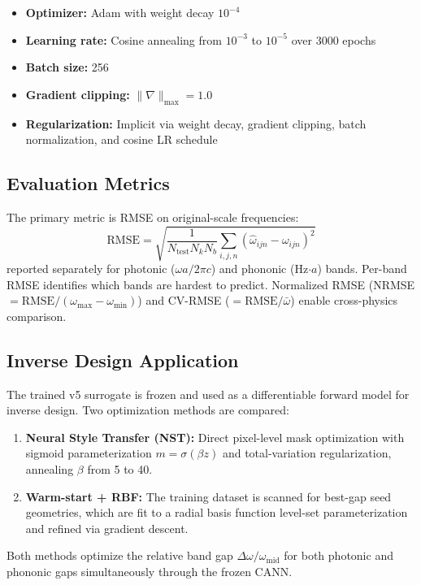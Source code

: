 \documentclass[11pt]{article}
\begin{document}
\begin{itemize}
    \item \textbf{Optimizer:} Adam with weight decay $10^{-4}$
    \item \textbf{Learning rate:} Cosine annealing from $10^{-3}$ to $10^{-5}$ over 3000 epochs
    \item \textbf{Batch size:} 256
    \item \textbf{Gradient clipping:} $\|\nabla\|_\text{max} = 1.0$
    \item \textbf{Regularization:} Implicit via weight decay, gradient clipping, batch normalization, and cosine LR schedule
\end{itemize}

\subsection{Evaluation Metrics}

The primary metric is RMSE on original-scale frequencies:
\begin{equation}
    \text{RMSE} = \sqrt{\frac{1}{N_\text{test} N_k N_b}\sum_{i,j,n}\left(\hat{\omega}_{ijn} - \omega_{ijn}\right)^2}
\end{equation}
reported separately for photonic ($\omega a/2\pi c$) and phononic (Hz$\cdot a$) bands. Per-band RMSE identifies which bands are hardest to predict. Normalized RMSE (NRMSE $= \text{RMSE}/(\omega_\text{max} - \omega_\text{min})$) and CV-RMSE ($= \text{RMSE}/\bar{\omega}$) enable cross-physics comparison.

\subsection{Inverse Design Application}

The trained v5 surrogate is frozen and used as a differentiable forward model for inverse design. Two optimization methods are compared:
\begin{enumerate}
    \item \textbf{Neural Style Transfer (NST):} Direct pixel-level mask optimization with sigmoid parameterization $m = \sigma(\beta z)$ and total-variation regularization, annealing $\beta$ from 5 to 40.
    \item \textbf{Warm-start + RBF:} The training dataset is scanned for best-gap seed geometries, which are fit to a radial basis function level-set parameterization and refined via gradient descent.
\end{enumerate}
Both methods optimize the relative band gap $\Delta\omega/\omega_\text{mid}$ for both photonic and phononic gaps simultaneously through the frozen CANN.
\end{document}
